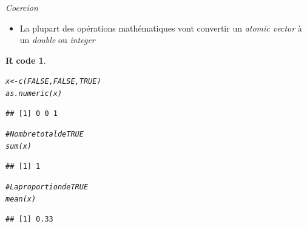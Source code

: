 \documentclass[11pt]{beamer}\usepackage[]{graphicx}\usepackage[]{color}
\makeatletter
\newcommand{\hlnum}[1]{\textcolor[rgb]{0.063,0.58,0.627}{#1}}%
\newcommand{\hlcom}[1]{\textcolor[rgb]{0.588,0.588,0.588}{#1}}%
\newcommand{\hlstd}[1]{\textcolor[rgb]{0.196,0.196,0.196}{#1}}%
\newcommand{\hlkwb}[1]{\textcolor[rgb]{0.627,0,0.314}{#1}}%
\newcommand{\hlkwd}[1]{\textcolor[rgb]{0.78,0.227,0.412}{#1}}%
\newenvironment{kframe}{%
 \def\at@end@of@kframe{}%
 \ifinner\ifhmode%
  \def\at@end@of@kframe{\end{minipage}}%
  \begin{minipage}{\columnwidth}%
 \fi\fi%
 \def\FrameCommand##1{\hskip\@totalleftmargin \hskip-\fboxsep
 \colorbox{shadecolor}{##1}\hskip-\fboxsep
     \hskip-\linewidth \hskip-\@totalleftmargin \hskip\columnwidth}%
 \MakeFramed {\advance\hsize-\width
   \@totalleftmargin\z@ \linewidth\hsize
   \@setminipage}}%
 {\par\unskip\endMakeFramed%
 \at@end@of@kframe}
\newenvironment{knitrout}{}{} %
\newtheorem{rcode}{R code}[section]
\makeatother
\begin{document}
\begin{frame}[fragile]{\textit{Coercion}}
\begin{itemize}
\item La plupart des opérations mathématiques vont convertir un \textit{atomic vector} à un \textit{double} ou \textit{integer}
\end{itemize}
\begin{knitrout}\footnotesize
{}\color{fgcolor}\begin{kframe}
\begin{rcode}\label{unnamed-chunk-17}\begin{alltt}
\hlstd{x} \hlkwb{<-} \hlkwd{c}\hlstd{(}\hlnum{FALSE}\hlstd{,} \hlnum{FALSE}\hlstd{,} \hlnum{TRUE}\hlstd{)}
\hlkwd{as.numeric}\hlstd{(x)}
\end{alltt}
\begin{verbatim}
## [1] 0 0 1
\end{verbatim}
\begin{alltt}
\hlcom{# Nombre total de TRUE}
\hlkwd{sum}\hlstd{(x)}
\end{alltt}
\begin{verbatim}
## [1] 1
\end{verbatim}
\begin{alltt}
\hlcom{# La proportion de TRUE}
\hlkwd{mean}\hlstd{(x)}
\end{alltt}
\begin{verbatim}
## [1] 0.33
\end{verbatim}
\end{rcode}\end{kframe}
\end{knitrout}
\end{frame}
\end{document}
